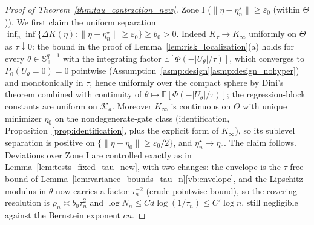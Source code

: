 \documentclass[11pt]{article}
\theoremstyle{definition}
\theoremstyle{plain}
\newcommand{\E}{\mathbb{E}}
\begin{document}
\begin{proof}[Proof of Theorem~\ref{thm:tau_contraction_new}]
Zone I ($\|\eta-\eta_n^\star\|\ge\varepsilon_0$ (within $\bar\Theta$)). We first claim the uniform separation
$\inf_{n}\inf\{\Delta K(\eta):\|\eta-\eta_n^\star\|\ge\varepsilon_0\}\ge b_0>0$.
Indeed $K_\tau\to K_\infty$ uniformly on $\bar\Theta$ as $\tau\downarrow0$: the bound in the proof of Lemma~\ref{lem:risk_localization}(a) holds for every $\theta\in\mathbb S^{q-1}_+$ with the integrating factor $\E[\Phi(-|U_\theta|/\tau)]$, which converges to $P_0(U_\theta=0)=0$ pointwise (Assumption~\ref{asmp:design}\ref{asmp:design_nohyper}) and monotonically in $\tau$, hence uniformly over the compact sphere by Dini's theorem combined with continuity of $\theta\mapsto\E[\Phi(-|U_\theta|/\tau)]$; the regression-block constants are uniform on $\mathcal K_a$. Moreover $K_\infty$ is continuous on $\bar\Theta$ with unique minimizer $\eta_0$ on the nondegenerate-gate class (identification, Proposition~\ref{prop:identification}, plus the explicit form of $K_\infty$), so its sublevel separation is positive on $\{\|\eta-\eta_0\|\ge\varepsilon_0/2\}$, and $\eta_n^\star\to\eta_0$. The claim follows. Deviations over Zone I are controlled exactly as in Lemma~\ref{lem:tests_fixed_tau_new}, with two changes: the envelope is the $\tau$-free bound of Lemma~\ref{lem:variance_bounds_tau_n}\ref{vb:envelope}, and the Lipschitz modulus in $\theta$ now carries a factor $\tau_n^{-2}$ (crude pointwise bound), so the covering resolution is $\rho_n\asymp b_0\tau_n^{2}$ and $\log N_n\le Cd\log(1/\tau_n)\le C'\log n$, still negligible against the Bernstein exponent $cn$.


\end{proof}
\end{document}
